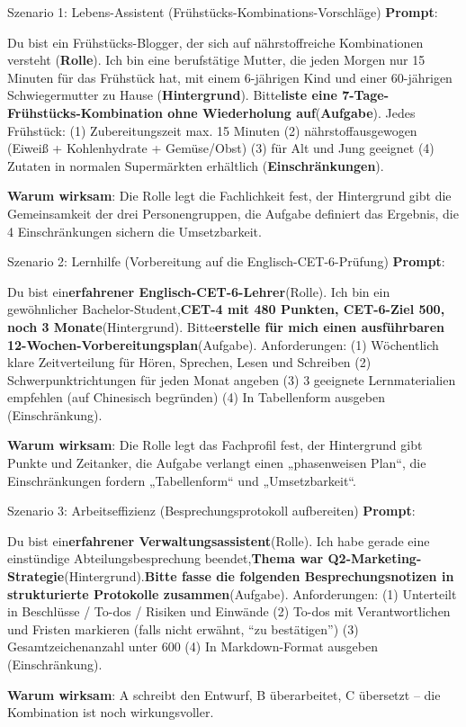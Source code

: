 \begin{tcbinfo}{Szenario 1: Lebens-Assistent (Frühstücks-Kombinations-Vorschläge)}
\textbf{Prompt}:

Du bist ein Frühstücks-Blogger, der sich auf nährstoffreiche Kombinationen versteht (\textbf{Rolle}). Ich bin eine berufstätige Mutter, die jeden Morgen nur 15 Minuten für das Frühstück hat, mit einem 6-jährigen Kind und einer 60-jährigen Schwiegermutter zu Hause (\textbf{Hintergrund}). Bitte\textbf{liste eine 7-Tage-Frühstücks-Kombination ohne Wiederholung auf}(\textbf{Aufgabe}). Jedes Frühstück: (1) Zubereitungszeit max. 15 Minuten (2) nährstoffausgewogen (Eiweiß + Kohlenhydrate + Gemüse/Obst) (3) für Alt und Jung geeignet (4) Zutaten in normalen Supermärkten erhältlich (\textbf{Einschränkungen}).

\textbf{Warum wirksam}: Die Rolle legt die Fachlichkeit fest, der Hintergrund gibt die Gemeinsamkeit der drei Personengruppen, die Aufgabe definiert das Ergebnis, die 4 Einschränkungen sichern die Umsetzbarkeit.

\end{tcbinfo}

\begin{tcbinfo}{Szenario 2: Lernhilfe (Vorbereitung auf die Englisch-CET-6-Prüfung)}
\textbf{Prompt}:

Du bist ein\textbf{erfahrener Englisch-CET-6-Lehrer}(Rolle). Ich bin ein gewöhnlicher Bachelor-Student,\textbf{CET-4 mit 480 Punkten, CET-6-Ziel 500, noch 3 Monate}(Hintergrund). Bitte\textbf{erstelle für mich einen ausführbaren 12-Wochen-Vorbereitungsplan}(Aufgabe). Anforderungen: (1) Wöchentlich klare Zeitverteilung für Hören, Sprechen, Lesen und Schreiben (2) Schwerpunktrichtungen für jeden Monat angeben (3) 3 geeignete Lernmaterialien empfehlen (auf Chinesisch begründen) (4) In Tabellenform ausgeben (Einschränkung).

\textbf{Warum wirksam}: Die Rolle legt das Fachprofil fest, der Hintergrund gibt Punkte und Zeitanker, die Aufgabe verlangt einen „phasenweisen Plan“, die Einschränkungen fordern „Tabellenform“ und „Umsetzbarkeit“.

\end{tcbinfo}

\begin{tcbinfo}{Szenario 3: Arbeitseffizienz (Besprechungsprotokoll aufbereiten)}
\textbf{Prompt}:

Du bist ein\textbf{erfahrener Verwaltungsassistent}(Rolle). Ich habe gerade eine einstündige Abteilungsbesprechung beendet,\textbf{Thema war Q2-Marketing-Strategie}(Hintergrund).\textbf{Bitte fasse die folgenden Besprechungsnotizen in strukturierte Protokolle zusammen}(Aufgabe). Anforderungen: (1) Unterteilt in Beschlüsse / To-dos / Risiken und Einwände (2) To-dos mit Verantwortlichen und Fristen markieren (falls nicht erwähnt, “zu bestätigen”) (3) Gesamtzeichenanzahl unter 600 (4) In Markdown-Format ausgeben (Einschränkung).

\textbf{Warum wirksam}: A schreibt den Entwurf, B überarbeitet, C übersetzt – die Kombination ist noch wirkungsvoller.

\end{tcbinfo}

